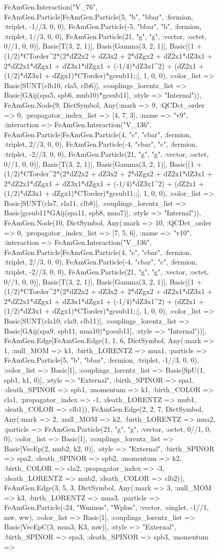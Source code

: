 \documentclass{revtex4}
\begin{document}
\begin{figure}[!htb]
\begin{center}
{FeAmGen.Interaction("V_76", FeAmGen.Particle[FeAmGen.Particle(5, "b", "bbar", :fermion, :triplet, -1//3, 0, 0), FeAmGen.Particle(-5, "bbar", "b", :fermion, :triplet, 1//3, 0, 0), FeAmGen.Particle(21, "g", "g", :vector, :octet, 0//1, 0, 0)], Basic[T(3, 2, 1)], Basic[Gamma(3, 2, 1)], Basic[(1 + (1/2)*CTorder^2*(2*dZ2x2 + dZ3x2 + 2*dZgx2 + dZ2x1*dZ3x1 + 2*dZ2x1*dZgx1 + dZ3x1*dZgx1 + (-1/4)*dZ3x1^2) + (dZ2x1 + (1/2)*dZ3x1 + dZgx1)*CTorder)*gcsub11;;], 1, 0, 0), :color_list => Basic[SUNT(clb10, cla5, clb6)], :couplings_lorentz_list => Basic[GAij(spa5, spb6, mub10)*gcsub11], :style => "Internal")), FeAmGen.Node(9, Dict{Symbol, Any}(:mark => 9, :QCDct_order => 0, :propagator_index_list => [4, 7, 3], :name => "v9", :interaction => FeAmGen.Interaction("V_136", FeAmGen.Particle[FeAmGen.Particle(4, "c", "cbar", :fermion, :triplet, 2//3, 0, 0), FeAmGen.Particle(-4, "cbar", "c", :fermion, :triplet, -2//3, 0, 0), FeAmGen.Particle(21, "g", "g", :vector, :octet, 0//1, 0, 0)], Basic[T(3, 2, 1)], Basic[Gamma(3, 2, 1)], Basic[(1 + (1/2)*CTorder^2*(2*dZ2x2 + dZ3x2 + 2*dZgx2 + dZ2x1*dZ3x1 + 2*dZ2x1*dZgx1 + dZ3x1*dZgx1 + (-1/4)*dZ3x1^2) + (dZ2x1 + (1/2)*dZ3x1 + dZgx1)*CTorder)*gcsub11;;], 1, 0, 0), :color_list => Basic[SUNT(cla7, cla11, clb8)], :couplings_lorentz_list => Basic[gcsub11*GAij(spa11, spb8, mua7)], :style => "Internal")), FeAmGen.Node(10, Dict{Symbol, Any}(:mark => 10, :QCDct_order => 0, :propagator_index_list => [7, 5, 6], :name => "v10", :interaction => FeAmGen.Interaction("V_136", FeAmGen.Particle[FeAmGen.Particle(4, "c", "cbar", :fermion, :triplet, 2//3, 0, 0), FeAmGen.Particle(-4, "cbar", "c", :fermion, :triplet, -2//3, 0, 0), FeAmGen.Particle(21, "g", "g", :vector, :octet, 0//1, 0, 0)], Basic[T(3, 2, 1)], Basic[Gamma(3, 2, 1)], Basic[(1 + (1/2)*CTorder^2*(2*dZ2x2 + dZ3x2 + 2*dZgx2 + dZ2x1*dZ3x1 + 2*dZ2x1*dZgx1 + dZ3x1*dZgx1 + (-1/4)*dZ3x1^2) + (dZ2x1 + (1/2)*dZ3x1 + dZgx1)*CTorder)*gcsub11;;], 1, 0, 0), :color_list => Basic[SUNT(cla10, cla9, clb11)], :couplings_lorentz_list => Basic[GAij(spa9, spb11, mua10)*gcsub11], :style => "Internal"))], FeAmGen.Edge[FeAmGen.Edge(1, 1, 6, Dict{Symbol, Any}(:mark => 1, :null_MOM => k1, :birth_LORENTZ => mua1, :particle => FeAmGen.Particle(5, "b", "bbar", :fermion, :triplet, -1//3, 0, 0), :color_list => Basic[1], :couplings_lorentz_list => Basic[SpU(1, spb1, k1, 0)], :style => "External", :birth_SPINOR => spa1, :death_SPINOR => spb1, :momentum => k1, :birth_COLOR => cla1, :propagator_index => -1, :death_LORENTZ => mub1, :death_COLOR => clb1)), FeAmGen.Edge(2, 2, 7, Dict{Symbol, Any}(:mark => 2, :null_MOM => k2, :birth_LORENTZ => mua2, :particle => FeAmGen.Particle(21, "g", "g", :vector, :octet, 0//1, 0, 0), :color_list => Basic[1], :couplings_lorentz_list => Basic[VecEp(2, mub2, k2, 0)], :style => "External", :birth_SPINOR => spa2, :death_SPINOR => spb2, :momentum => k2, :birth_COLOR => cla2, :propagator_index => -3, :death_LORENTZ => mub2, :death_COLOR => clb2)), FeAmGen.Edge(3, 5, 3, Dict{Symbol, Any}(:mark => 3, :null_MOM => k3, :birth_LORENTZ => mua3, :particle => FeAmGen.Particle(-24, "Wminus", "Wplus", :vector, :singlet, -1//1, mw, ww), :color_list => Basic[1], :couplings_lorentz_list => Basic[VecEpC(3, mua3, K3, mw)], :style => "External", :birth_SPINOR => spa3, :death_SPINOR => spb3, :momentum => }
\end{center}
\end{figure}
\end{document}
